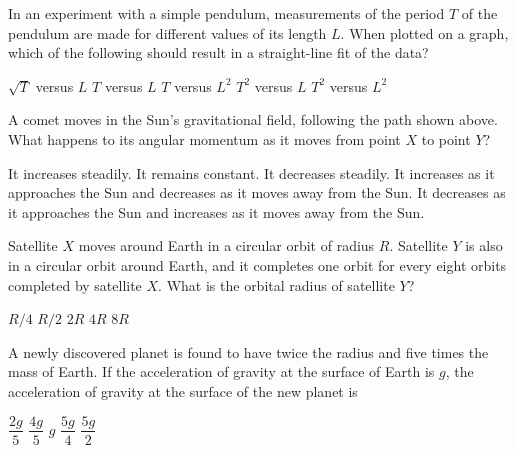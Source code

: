 \documentclass[12pt]{../oss-classkick-exam}
\begin{document}
\begin{questions}
  \question In an experiment with a simple pendulum, measurements of the period
  $T$ of the pendulum are made for different values of its length $L$.
  When plotted on a graph, which of the following should result in a
  straight-line fit of the data?
  \begin{choices}
    \choice $\sqrt T$ versus $L$
    \choice $T$ versus $L$
    \choice $T$ versus $L^2$
    \choice $T^2$ versus $L$
    \choice $T^2$ versus $L^2$
  \end{choices}
  \newpage
  
  \vspace{-.3in} 
  \question A comet moves in the Sun's gravitational field, following the path
  shown above. What happens to its angular momentum as it moves from point $X$
  to point $Y$?
  \begin{choices}
    \choice It increases steadily.
    \choice It remains constant.
    \choice It decreases steadily.
    \choice It increases as it approaches the Sun and decreases as it moves
    away from the Sun.
    \choice It decreases as it approaches the Sun and increases as it moves
    away from the Sun.
  \end{choices}

  \question Satellite $X$ moves around Earth in a circular orbit of radius $R$.
  Satellite $Y$ is also in a circular orbit around Earth, and it completes one
  orbit for every eight orbits completed by satellite $X$. What is the
  orbital radius of satellite $Y$?
  \begin{choices}
    \choice $R/4$
    \choice $R/2$
    \choice $2R$
    \choice $4R$
    \choice $8R$
  \end{choices}
  
  \question A newly discovered planet is found to have twice the radius and five
  times the mass of Earth. If the acceleration of gravity at the surface of
  Earth is $g$, the acceleration of gravity at the surface of the new planet is
  \begin{choices}
    \choice $\dfrac{2g}5$
    \choice $\dfrac{4g}5$
    \choice $g$
    \choice $\dfrac{5g}4$
    \choice $\dfrac{5g}2$
  \end{choices}
  
  

\end{questions}
\end{document}
